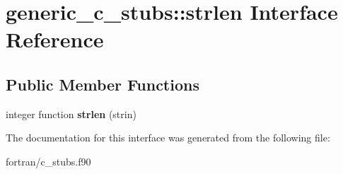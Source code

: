 \hypertarget{interfacegeneric__c__stubs_1_1strlen}{}\section{generic\+\_\+c\+\_\+stubs\+:\+:strlen Interface Reference}
\label{interfacegeneric__c__stubs_1_1strlen}
\subsection*{Public Member Functions}
\begin{DoxyCompactItemize}
\item 
\mbox{\label{interfacegeneric__c__stubs_1_1strlen_a43ecd618e383be49428785d8dd12a841}} 
integer function {\bfseries strlen} (strin)
\end{DoxyCompactItemize}


The documentation for this interface was generated from the following file\+:\begin{DoxyCompactItemize}
\item 
fortran/c\+\_\+stubs.\+f90\end{DoxyCompactItemize}
